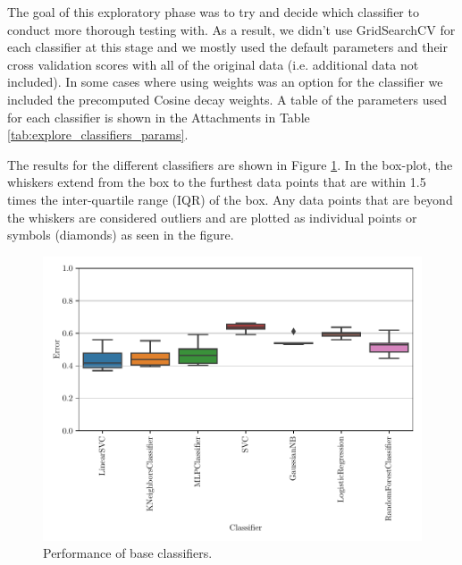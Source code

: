 The goal of this exploratory phase was to try and decide which classifier to conduct more thorough testing with. As a result, we didn't use GridSearchCV for each classifier at this stage and we mostly used the default parameters and their cross validation scores with all of the original data (i.e. additional data not included). In some cases where using weights was an option for the classifier we included the precomputed Cosine decay weights. A table of the parameters used for each classifier is shown in the Attachments in Table \ref{tab:explore_classifiers_params}.


The results for the different classifiers are shown in Figure \ref{fig:explore_classifiers}. In the box-plot, the whiskers extend from the box to the furthest data points that are within 1.5 times the inter-quartile range (IQR) of the box. Any data points that are beyond the whiskers are considered outliers and are plotted as individual points or symbols (diamonds) as seen in the figure.

\begin{figure}[ht]
  \centering
  \includegraphics[width=\scale\textwidth]{../img/plot_explore_classifiers.pdf}
  \caption{Performance of base classifiers.}
  \label{fig:explore_classifiers}
\end{figure} 

